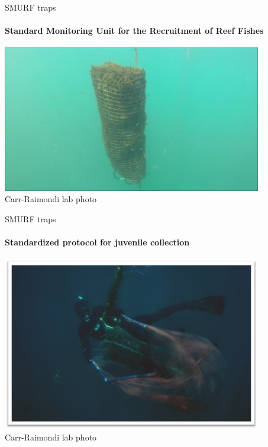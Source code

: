 \documentclass[letter,graphicx]{beamer}
\begin{document}
\begin{frame}{SMURF traps}
\framesubtitle{Standard Monitoring Unit for the Recruitment of Reef Fishes}
\begin{center}
\includegraphics[width = 0.85\textwidth]{mhap_figs/smurf-solo.png}\\
{\tiny Carr-Raimondi lab photo}
\end{center}
\end{frame}



\begin{frame}{SMURF traps}
\framesubtitle{Standardized protocol for juvenile collection}
\begin{center}
\includegraphics[width = 0.85\textwidth]{mhap_figs/smurf-binkie.png}\\
{\tiny Carr-Raimondi lab photo}
\end{center}
\end{frame}
\end{document}
